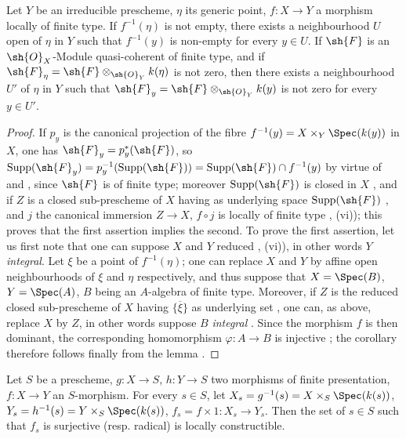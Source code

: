 \begin{corollary}[1.8.6]
\label{IV.1.8.6}
Let $Y$ be an irreducible prescheme, $\eta$ its generic point, $f:X\to Y$ a morphism locally of finite type.
If $f^{-1}(\eta)$ is not empty, there exists a neighbourhood $U$ open of $\eta$ in $Y$ such that $f^{-1}(y)$ is non-empty for every $y\in U$.
If $\sh{F}$ is an $\sh{O}_X$-Module quasi-coherent of finite type, and if $\sh{F}_\eta=\sh{F}\otimes_{\sh{O}_Y} k(\eta)$ is not zero, then there exists a neighbourhood $U'$ of $\eta$ in $Y$ such that $\sh{F}_y=\sh{F}\otimes_{\sh{O}_Y} k(y)$ is not zero for every $y\in U'$.
\end{corollary}

\begin{proof}
If $p_y$ is the canonical projection of the fibre $f^{-1}(y)=X\times_Y\Spec(k(y))$ in $X$, one has $\sh{F}_y=p_y^*(\sh{F})$, so $\mathrm{Supp}(\sh{F}_y)=p_y^{-1}(\mathrm{Supp}(\sh{F}))=\mathrm{Supp}(\sh{F})\cap f^{-1}(y)$ by virtue of  and , since $\sh{F}$ is of finite type; moreover $\mathrm{Supp}(\sh{F})$ is closed in $X$ , and if $Z$ is a closed sub-prescheme of $X$ having as underlying space $\mathrm{Supp}(\sh{F})$ , and $j$ the canonical immersion $Z\to X$, $f\circ j$ is locally of finite type , (vi)); this proves that the first assertion implies the second.
To prove the first assertion, let us first note that one can suppose $X$ and $Y$ reduced , (vi)), in other words $Y$ \emph{integral}.
Let $\xi$ be a point of $f^{-1}(\eta)$; one can replace $X$ and $Y$ by affine open neighbourhoods of $\xi$ and $\eta$ respectively, and thus suppose that $X=\Spec(B)$, $Y=\Spec(A)$, $B$ being an $A$-algebra of finite type.
Moreover, if $Z$ is the reduced closed sub-prescheme of $X$ having $\{\overline{\xi}\}$ as underlying set , one can, as above, replace $X$ by $Z$, in other words suppose $B$ \emph{integral} .
Since the morphism $f$ is then dominant, the corresponding homomorphism $\varphi:A\to B$ is injective ; the corollary therefore follows finally from the lemma .
\end{proof}

\begin{proposition}[1.8.7]
\label{IV.1.8.7}
Let $S$ be a prescheme, $g:X\to S$, $h:Y\to S$ two morphisms of finite presentation, $f:X\to Y$ an $S$-morphism.
For every $s\in S$, let $X_s=g^{-1}(s)=X\times_S\Spec(k(s))$, $Y_s=h^{-1}(s)=Y\times_S\Spec(k(s))$, $f_s=f\times 1:X_s\to Y_s$.
Then the set of $s\in S$ such that $f_s$ is surjective (resp. radical) is locally constructible.
\end{proposition}

